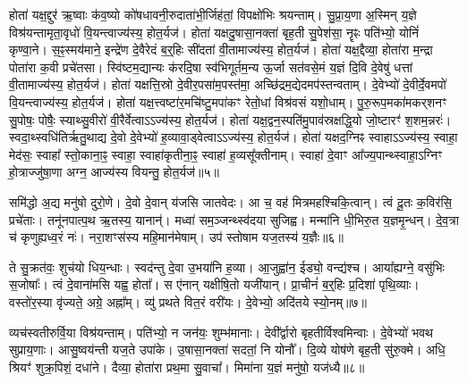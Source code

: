 होता॑ यक्ष॒द्दुर॑ ऋ॒ष्वाः क॑व॒ष्यो को॑षधावनी॒रुदाता॑भी॒र्जिह॑तां॒ विपक्षो॑भिः श्रयन्ताम्।
सु॒प्रा॒य॒णा अ॒स्मिन् य॒ज्ञे विश्र॑यन्तामृता॒वृधो॑ वि॒यन्त्वाज्य॑स्य॒ होत॒र्यज॑।
होता॑ यक्षदु॒षासा॒नक्ता॑ बृह॒ती सु॒पेश॑सा॒ नॄꣴः पति॑भ्यो॒ योनिं॑ कृण्वा॒ने।
स॒ꣴ॒स्मय॑माने॒ इन्द्रे॑ण दे॒वैरेदं ब॒र्॒हिः सी॑दतां वी॒तामाज्य॑स्य॒ होत॒र्यज॑।
होता॑ यक्ष॒द्दैव्या॒ होता॑रा म॒न्द्रा पोता॑रा क॒वी प्रचे॑तसा।
स्वि॑ष्टम॒द्यान्यः क॑रदि॒षा स्व॑भिगूर्तम॒न्य ऊ॒र्जा सत॑वसे॒मं य॒ज्ञं दि॒वि दे॒वेषु॑ धत्तां वी॒तामाज्य॑स्य॒ होत॒र्यज॑।
होता॑ यक्षत्ति॒स्रो दे॒वीर॒पसा॑म॒पस्त॑मा॒ अच्छि॑द्रम॒द्येदमप॑स्तन्वताम्।
दे॒वेभ्यो॑ दे॒वीर्दे॒वमपो॑ वि॒यन्त्वाज्य॑स्य॒ होत॒र्यज॑।
होता॑ यक्ष॒त्त्वष्टा॑र॒मचि॑ष्टु॒मपा॑कꣳ रेतो॒धां विश्र॑वसं यशो॒धाम्।
पु॒रु॒रूप॒मका॑मकर्‌\mbox{}शनꣳ सु॒पोषः॒ पोषैः॒ स्याथ्सु॒वीरो॑ वी॒रैर्वेत्वा\-ऽ\-ऽ\-ज्य॑स्य॒ होत॒र्यज॑।
होता॑ यक्ष॒द्वन॒स्पति॑मु॒पाव॑स्रक्षद्धि॒यो जो॒ष्टारꣳ॑ श॒शम॒न्नरः॑।
स्वदा॒थ्स्वधि॑तिर्\mbox{}ऋतु॒थाद्य दे॒वो दे॒वेभ्यो॑ ह॒व्यावा॒ड्वेत्वा\-ऽ\-ऽ\-ज्य॑स्य॒ होत॒र्यज॑।
होता॑ यक्षद॒ग्निꣴ स्वाहा\-ऽऽज्य॑स्य॒ स्वाहा॒ मेद॑सः॒ स्वाहा᳚ स्तो॒काना॒ꣴ॒ स्वाहा॒ स्वाहा॑कृतीना॒ꣴ॒ स्वाहा॑ ह॒व्यसू᳚क्तीनाम्।
स्वाहा॑ दे॒वाꣳ आ᳚ज्य॒पान्थ्स्वाहा॒\-ऽग्निꣳ हो॒त्राज्जु॑षा॒णा अग्न॒ आज्य॑स्य वियन्तु॒ होत॒र्यज॑॥५॥

समि॑द्धो अ॒द्य मनु॑षो दुरो॒णे।
दे॒वो दे॒वान् य॑जसि जातवेदः।
आ च॒ वह॑ मित्रमहश्चिकि॒त्वान्।
त्वं दू॒तः क॒विर॑सि॒ प्रचे॑ताः।
तनू॑नपात्प॒थ ऋ॒तस्य॒ यानान्॑।
मध्वा॑ सम॒ञ्जन्थ्स्व॑दया सुजिह्व।
मन्मा॑नि धी॒भिरु॒त य॒ज्ञमृ॒न्धन्।
दे॒व॒त्रा च॑ कृणुह्यध्व॒रं नः॑।
नरा॒शꣳस॑स्य महि॒मान॑मेषाम्।
उप॑ स्तोषाम यज॒तस्य॑ य॒ज्ञैः॥६॥

ते सु॒क्रत॑वः॒ शुच॑यो धिय॒न्धाः।
स्वद॑न्तु दे॒वा उ॒भया॑नि ह॒व्या।
आ॒जुह्वा॑न॒ ईड्यो॒ वन्द्य॑श्च।
आया᳚ह्यग्ने॒ वसु॑भिः स॒जोषाः᳚।
त्वं दे॒वाना॑मसि यह्व॒ होता᳚।
स ए॑नान् यक्षीषि॒तो यजी॑यान्।
प्रा॒चीनं॑ ब॒र्‌॒\mbox{}हिः प्र॒दिशा॑ पृथि॒व्याः।
वस्तो॑र॒स्या वृ॑ज्यते॒ अग्रे॒ अह्ना᳚म्।
व्यु॑ प्रथते वित॒रं वरी॑यः।
दे॒वेभ्यो॒ अदि॑तये स्यो॒नम्॥७॥

व्यच॑स्वतीरुर्वि॒या विश्र॑यन्ताम्।
पति॑भ्यो॒ न जन॑यः॒ शुम्भ॑\-मानाः।
देवी᳚र्द्वारो बृहतीर्विश्वमिन्वाः।
दे॒वेभ्यो॑ भवथ सुप्राय॒णाः।
आसु॒ष्वय॑न्ती यज॒ते उपा॑के।
उ॒षासा॒नक्ता॑ सदतां॒ नि योनौ᳚।
दि॒व्ये योष॑णे बृह॒ती सु॑रु॒क्मे।
अधि॒ श्रियꣳ॑ शुक्र॒पिशं॒ दधा॑ने।
दैव्या॒ होता॑रा प्रथ॒मा सु॒वाचा᳚।
मिमा॑ना य॒ज्ञं मनु॑षो॒ यज॑ध्यै॥८॥

